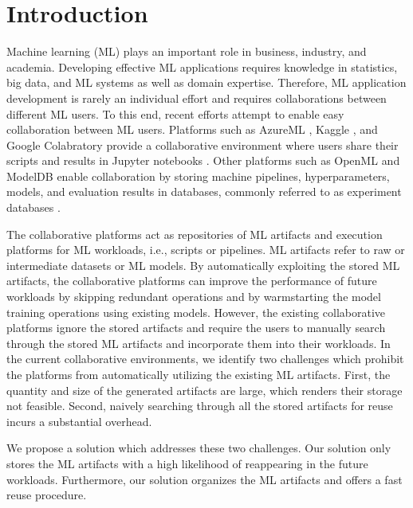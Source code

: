 \section{Introduction} \label{sec-introduction}
Machine learning (ML) plays an important role in business, industry, and academia. 
Developing effective ML applications requires knowledge in statistics, big data, and ML systems as well as domain expertise.
Therefore, ML application development is rarely an individual effort and requires collaborations between different ML users.
To this end, recent efforts attempt to enable easy collaboration between ML users.
Platforms such as AzureML \cite{team2016azureml}, Kaggle \cite{kagglewebsite}, and Google Colabratory \cite{googlecolab} provide a collaborative environment where users share their scripts and results in Jupyter notebooks \cite{Kluyver:2016aa}.
Other platforms such as OpenML \cite{vanschoren2014openml} and ModelDB \cite{vartak2016m} enable collaboration by storing machine pipelines, hyperparameters, models, and evaluation results in databases, commonly referred to as experiment databases \cite{Vanschoren2012}.

The collaborative platforms act as repositories of ML artifacts and execution platforms for ML workloads, i.e., scripts or pipelines.
ML artifacts refer to raw or intermediate datasets or ML models.
By automatically exploiting the stored ML artifacts, the collaborative platforms can improve the performance of future workloads by skipping redundant operations and by warmstarting the model training operations using existing models.
However, the existing collaborative platforms ignore the stored artifacts and require the users to manually search through the stored ML artifacts and incorporate them into their workloads.
In the current collaborative environments, we identify two challenges which prohibit the platforms from automatically utilizing the existing ML artifacts.
First, the quantity and size of the generated artifacts are large, which renders their storage not feasible.
Second, naively searching through all the stored artifacts for reuse incurs a substantial overhead.

We propose a solution which addresses these two challenges.
Our solution only stores the ML artifacts with a high likelihood of reappearing in the future workloads.
Furthermore, our solution organizes the ML artifacts and offers a fast reuse procedure.

